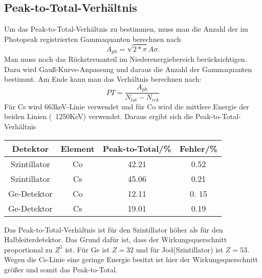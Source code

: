\documentclass[ngerman,11pt]{article}
\begin{document}
\begin{multicols}{2}
	 \subsection{Peak-to-Total-Verh\"altnis}
	 Um das Peak-to-Total-Verh\"altnis zu bestimmen, muss man die Anzahl der im Photopeak registrierten Gammaquanten berechnen nach
	 $$
	 A_{ph} = \sqrt{2*\pi}A\sigma.
	 $$
	 Man muss noch das R\"uckstreuanteil im Niederenergiebereich ber\"ucksichtigen. Dazu wird Gau\ss-Kurve-Anpassung und daraus die Anzahl der Gammaquanten bestimmt. Am Ende kann man das Verh\"altnis berechnen nach:
	 $$
	 PT = \frac{A_{ph}}{N_{tot}-N_{rck}}
	 $$
	 F\"ur Cs wird 663keV-Linie verwendet und f\"ur Co wird die mittlere Energie der beiden Linien (~1250KeV) verwendet. Daraus ergibt sich die Peak-to-Total-Verh\"altnis
	 \begin{center}
	 	\begin{tabular}{|c|c|c|c|}
	 		\hline
	 		Detektor&Element & Peak-to-Total/\% &Fehler/\%\\ \hline
	 		Szintillator& Co & 42.21 & 0.52\\ \hline
	 		Szintillator& Cs & 45.06 & 0.21\\ \hline
	 		Ge-Detektor& Co & 12.11 & 0. 15\\ \hline
	 		Ge-Detektor& Cs & 19.01 & 0.19\\ \hline
	 	\end{tabular}
	 \end{center}
 	Das Peak-to-Total-Verh\"altnis ist f\"ur den Szintillator h\"oher als f\"ur den Halbleiterdetektor. Das Grund daf\"ur ist, dass der Wirkungsquerschnitt proportional zu $Z^5$ ist. F\"ur Ge ist $Z = 32$ und f\"ur Jod(Szintillator) ist $Z = 53$. Wegen die Cs-Linie eine geringe Energie besitzt ist hier der Wirkungsquerschnitt gr\"o\ss er und somit das Peak-to-Total.

\end{multicols}
\end{document}
